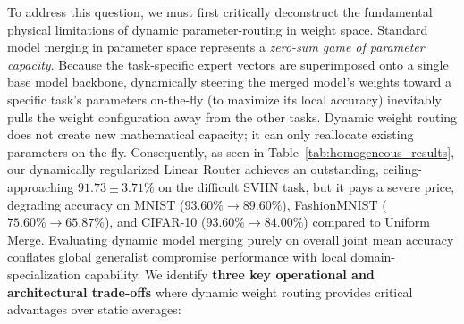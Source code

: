 To address this question, we must first critically deconstruct the fundamental physical limitations of dynamic parameter-routing in weight space. Standard model merging in parameter space represents a \textit{zero-sum game of parameter capacity}. Because the task-specific expert vectors are superimposed onto a single base model backbone, dynamically steering the merged model's weights toward a specific task's parameters on-the-fly (to maximize its local accuracy) inevitably pulls the weight configuration away from the other tasks. Dynamic weight routing does not create new mathematical capacity; it can only reallocate existing parameters on-the-fly. Consequently, as seen in Table~\ref{tab:homogeneous_results}, our dynamically regularized Linear Router achieves an outstanding, ceiling-approaching $91.73 \pm 3.71$\% on the difficult SVHN task, but it pays a severe price, degrading accuracy on MNIST ($93.60\% \rightarrow 89.60\%$), FashionMNIST ($75.60\% \rightarrow 65.87\%$), and CIFAR-10 ($93.60\% \rightarrow 84.00\%$) compared to Uniform Merge. Evaluating dynamic model merging purely on overall joint mean accuracy conflates global generalist compromise performance with local domain-specialization capability. We identify \textbf{three key operational and architectural trade-offs} where dynamic weight routing provides critical advantages over static averages:
